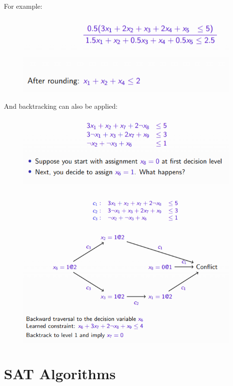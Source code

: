 \documentclass[10pt,a4paper]{report}
\begin{document}
For example:
\begin{figure}[H]
    \centering
    \includegraphics[scale=0.5]{26.png}
\end{figure}
And backtracking can also be applied:
\begin{figure}[H]
    \centering
    \includegraphics[scale=0.5]{27.png}
\end{figure}
\begin{figure}[H]
    \centering
    \includegraphics[scale=0.5]{28.png}
\end{figure}


\section{SAT Algorithms}
\end{document}
